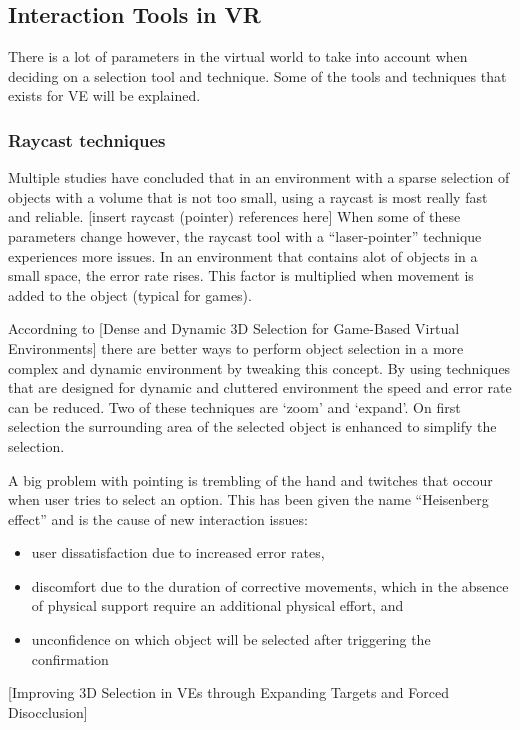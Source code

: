 \subsection{Interaction Tools in VR}
There is a lot of parameters in the virtual world to take into account when deciding on a selection tool and technique. Some of the tools and techniques that exists for VE will be explained.

\subsubsection{Raycast techniques}
Multiple studies have concluded that in an environment with a sparse selection of objects with a volume that is not too small, using a raycast is most really fast and reliable. [insert raycast (pointer) references here] When some of these parameters change however, the raycast tool with a “laser-pointer” technique experiences more issues. In an environment that contains alot of objects in a small space, the error rate rises. This factor is multiplied when movement is added to the object (typical for games).

Accordning to [Dense and Dynamic 3D Selection for Game-Based Virtual Environments] there are better ways to perform object selection in a more complex and dynamic environment by tweaking this concept. By using techniques that are designed for dynamic and cluttered environment the speed and error rate can be reduced. Two of these techniques are ‘zoom’ and ‘expand’. On first selection the surrounding area of the selected object is enhanced to simplify the selection.

A big problem with pointing is trembling of the hand and twitches that occour when user tries to select an option. This has been given the name “Heisenberg effect” and is the cause of new interaction issues:

\begin{itemize}
\item user dissatisfaction due to increased error rates,
\item discomfort due to the duration of corrective movements, which in the absence of physical support require an additional physical effort, and
\item unconfidence on which object will be selected after triggering the confirmation
\end{itemize}
[Improving 3D Selection in VEs through Expanding Targets and Forced Disocclusion]
